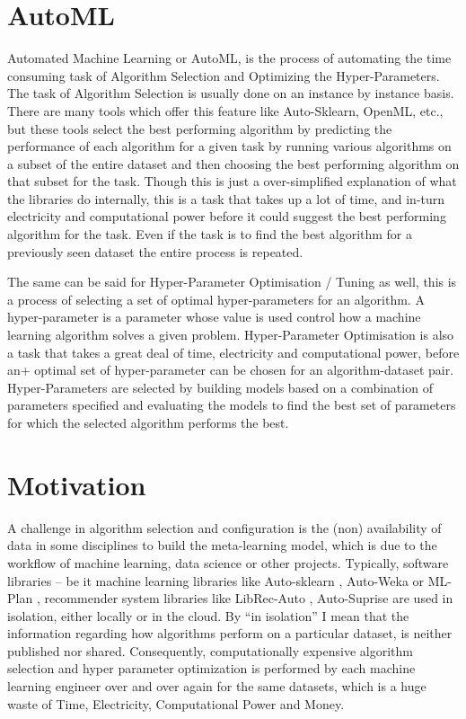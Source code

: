 \section{AutoML}
Automated Machine Learning or AutoML, is the process of automating the time consuming task of Algorithm Selection and Optimizing the Hyper-Parameters. The task of Algorithm Selection is usually done on an instance by instance basis. There are many tools which offer this feature like Auto-Sklearn, OpenML, etc., but these tools select the best performing algorithm by predicting the performance of each algorithm for a given task by running various algorithms on a subset of the entire dataset and then choosing the best performing algorithm on that subset for the task. Though this is just a over-simplified explanation of what the libraries do internally, this is a task that takes up a lot of time, and in-turn electricity and computational power before it could suggest the best performing algorithm for the task. Even if the task is to find the best algorithm for a previously seen dataset the entire process is repeated.

The same can be said for Hyper-Parameter Optimisation / Tuning as well, this is a process of selecting a set of optimal hyper-parameters for an algorithm. A hyper-parameter is a parameter whose value is used control how a machine learning algorithm solves a given problem. Hyper-Parameter Optimisation is also a task that takes a great deal of time, electricity and computational power, before an+ optimal set of hyper-parameter can be chosen for an algorithm-dataset pair. Hyper-Parameters are selected by building models based on a combination of parameters specified and evaluating the models to find the best set of parameters for which the selected algorithm performs the best.

\section{Motivation}
A challenge in algorithm selection and configuration is the (non) availability of data in some disciplines to build the meta-learning model, which is due to the workflow of machine learning, data science or other projects. Typically, software libraries – be it machine learning libraries like Auto-sklearn \citep{feurer:m}, Auto-Weka \citep{kotthoff:l} or ML-Plan \citep{mohr:f}, recommender system libraries like LibRec-Auto \citep{mansoury:m}, Auto-Suprise \citep{rohan-joeran} are used in isolation, either locally or in the cloud. By “in isolation” I mean that the information regarding how algorithms perform on a particular dataset, is neither published nor shared. Consequently, computationally expensive algorithm selection and hyper parameter optimization is performed by each machine learning engineer over and over again for the same datasets, which is a huge waste of Time, Electricity, Computational Power and Money.

